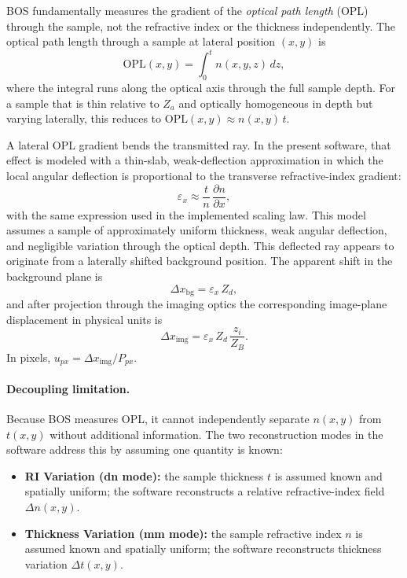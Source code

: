 \documentclass[11pt]{article}
\begin{document}
BOS fundamentally measures the gradient of the \emph{optical path length}
(OPL) through the sample, not the refractive index or the thickness
independently. The optical path length through a sample at lateral position
$(x, y)$ is
\begin{equation}
  \mathrm{OPL}(x,y) = \int_0^t n(x, y, z)\,dz,
\end{equation}
where the integral runs along the optical axis through the full sample depth.
For a sample that is thin relative to $Z_a$ and optically homogeneous in
depth but varying laterally, this reduces to $\mathrm{OPL}(x,y) \approx
n(x,y)\,t$.

A lateral OPL gradient bends the transmitted ray. In the present software,
that effect is modeled with a thin-slab, weak-deflection approximation in
which the local angular deflection is proportional to the transverse
refractive-index gradient:
\begin{equation}
  \varepsilon_x
  \approx \frac{t}{n}\,\frac{\partial n}{\partial x},
  \label{eq:deflection}
\end{equation}
with the same expression used in the implemented scaling law. This model
assumes a sample of approximately uniform thickness, weak angular
deflection, and negligible variation through the optical depth.
This deflected ray appears to originate from a laterally shifted background
position. The apparent shift in the background plane is
\begin{equation}
  \Delta x_{\mathrm{bg}} = \varepsilon_x\,Z_d,
\end{equation}
and after projection through the imaging optics the corresponding
image-plane displacement in physical units is
\begin{equation}
  \Delta x_{\mathrm{img}} = \varepsilon_x\,Z_d\,\frac{z_i}{Z_B}.
  \label{eq:imgshift}
\end{equation}
In pixels, $u_{px} = \Delta x_{\mathrm{img}} / P_{px}$.

\paragraph{Decoupling limitation.}
Because BOS measures OPL, it cannot independently separate $n(x,y)$ from
$t(x,y)$ without additional information. The two reconstruction modes in
the software address this by assuming one quantity is known:

\begin{itemize}[noitemsep]
  \item \textbf{RI Variation (dn mode):} the sample thickness $t$ is assumed
        known and spatially uniform; the software reconstructs a relative
        refractive-index field $\Delta n(x,y)$.
  \item \textbf{Thickness Variation (mm mode):} the sample refractive index
        $n$ is assumed known and spatially uniform; the software reconstructs
        thickness variation $\Delta t(x,y)$.
\end{itemize}
\end{document}
